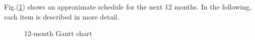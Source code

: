 Fig.(\ref{fig:gantt}) shows an approximate schedule for the next 12 months. In the following, each item is described in more detail.
\begin{figure}[hp]
\centering
{}
\caption{12-month Gantt chart}
\label{fig:gantt}
\end{figure}
